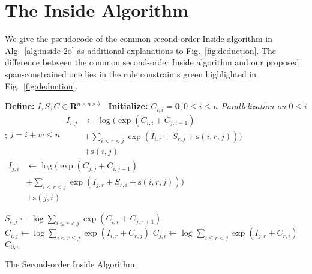 \documentclass[11pt]{article}
\begin{document}
\section{The Inside Algorithm}\label{sec:inside}

We give the pseudocode of the common second-order Inside algorithm \cite{mcdonald-pereira-2006-online} in Alg.~\ref{alg:inside-2o} as additional explanations to Fig.~\ref{fig:deduction}.
The difference between the common second-order Inside algorithm and our proposed span-constrained one lies in the rule constraints green highlighted in Fig.~\ref{fig:deduction}.
\begin{algorithm}[tb!]
    \begin{algorithmic}[1]
        \newlength{\commentindent}
        \setlength{\commentindent}{.24\textwidth}
        \renewcommand{\algorithmiccomment}[1]{\unskip\hfill\makebox[\commentindent][l]{$\rhd$~#1}\par}
        \LetLtxMacro{\oldalgorithmic}{\algorithmic}
        \renewcommand{\algorithmic}[1][0]{\oldalgorithmic[#1]
            \renewcommand{\ALC@com}[1]{\ifnum\pdfstrcmp{##1}{default}=0\else\algorithmiccomment{##1}\fi}
        }
        \STATE \textbf{Define:} $I, S, C \in \mathbf{R}^{n \times n \times b}$
        \STATE $\;$ 
        \STATE \textbf{Initialize:} $C_{i, i} = \mathbf{0}, 0 \le i \le n$\label{alg:init}
        \STATE \emph{Parallelization on} $0 \le i$; $j=i+w \le n$
        \STATE $\begin{aligned}
                I_{i, j} & \leftarrow \log(\exp(C_{i, i} + C_{j, i+1})                         \\
                         & + \sum_{i < r < j} \exp(I_{i, r} + S_{r, j} + \mathrm{s}(i, r, j))) \\
                         & + \mathrm{s}(i, j)
            \end{aligned} $\label{alg:incomplete-r}
        \STATE $\begin{aligned}
                I_{j, i} & \leftarrow \log(\exp(C_{j, j} + C_{i, j-1})                         \\
                         & + \sum_{i < r < j} \exp(I_{j, r} + S_{r, i} + \mathrm{s}(i, r, j))) \\
                         & + \mathrm{s}(j, i)
            \end{aligned} $\label{alg:incomplete-l}


        \STATE $S_{i, j} \leftarrow \log\sum_{i \le r < j} \exp(C_{i, r} +  C_{j, r+1})$\label{alg:sib}
        \STATE $C_{i, j} \leftarrow \log\sum_{i < r \le j} \exp(I_{i, r} +  C_{r, j})$\label{alg:complete-r}
        \STATE $C_{j, i} \leftarrow \log\sum_{i \le r < j} \exp(I_{j, r} +  C_{r, i})$\label{alg:complete-l}
        \ENDFOR
        \RETURN $C_{0, n}$
    \end{algorithmic}
    \caption{The Second-order Inside Algorithm.}
    \label{alg:inside-2o}
\end{algorithm}
\end{document}

